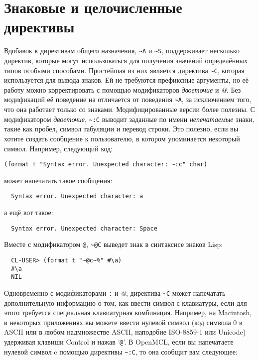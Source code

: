 {\section{Знаковые и целочисленные директивы}

Вдобавок к директивам общего назначения, \lstinline!~A! и \lstinline!~S!, 
поддерживает несколько директив, которые могут использоваться для получения значений
определённых типов особыми способами. Простейшая из них является директива \lstinline!~C!,
которая используется для вывода знаков. Ей не требуются префиксные аргументы, но её работу
можно корректировать с помощью модификаторов \textit{двоеточие} и \textit{@}. Без
модификаций её поведение на отличается от поведения \lstinline!~A!, за исключением того,
что она работает только со знаками. Модифицированные версии более полезны. С модификатором
\textit{двоеточие}, \lstinline!~:C! выводит заданные по имени \textit{непечатаемые} знаки,
такие как пробел, символ табуляции и перевод строки. Это полезно, если вы хотите создать
сообщение к пользователю, в котором упоминается некоторый символ. Например, следующий код:

\begin{lstlisting}
(format t "Syntax error. Unexpected character: ~:c" char)
\end{lstlisting}

может напечатать такое сообщения:

\begin{verbatim}
  Syntax error. Unexpected character: a
\end{verbatim}

а ещё вот такое:

\begin{verbatim}
  Syntax error. Unexpected character: Space
\end{verbatim}

Вместе с модификатором \lstinline!@!, \lstinline!~@С! выведет знак в синтаксисе знаков
Lisp:

\begin{verbatim}
  CL-USER> (format t "~@c~%" #\a)
  #\a
  NIL
\end{verbatim}

Одновременно с модификаторами \lstinline!:! и \textit{@}, директива \lstinline!~C! может
напечатать дополнительную информацию о том, как ввести символ с клавиатуры, если для этого
требуется специальная клавиатурная комбинация. Например, на Macintosh, в некоторых
приложениях вы можете ввести нулевой символ (код символа 0 в ASCII или в любом
надмножестве ASCII, наподобие ISO-8859-1 или Unicode) удерживая клавиши Control и нажав
'\lstinline!@!'. В OpenMCL, если вы напечатаете нулевой символ c помощью директивы
\lstinline!~:C!, то она сообщит вам следующее:
  
}
